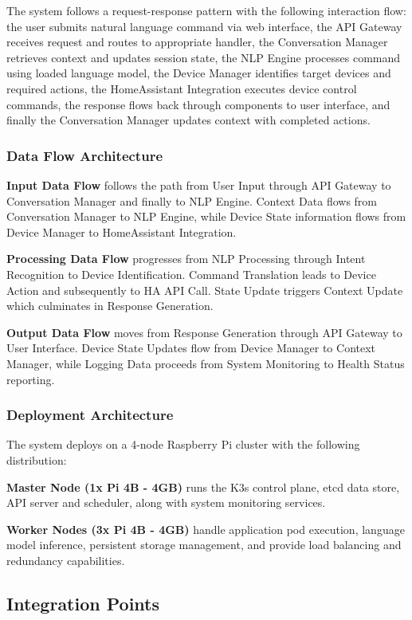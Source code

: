 \documentclass[12pt]{article}
\begin{document}
The system follows a request-response pattern with the following interaction flow: the user submits natural language command via web interface, the API Gateway receives request and routes to appropriate handler, the Conversation Manager retrieves context and updates session state, the NLP Engine processes command using loaded language model, the Device Manager identifies target devices and required actions, the HomeAssistant Integration executes device control commands, the response flows back through components to user interface, and finally the Conversation Manager updates context with completed actions.

\subsubsection{Data Flow Architecture}

\textbf{Input Data Flow} follows the path from User Input through API Gateway to Conversation Manager and finally to NLP Engine. Context Data flows from Conversation Manager to NLP Engine, while Device State information flows from Device Manager to HomeAssistant Integration.

\textbf{Processing Data Flow} progresses from NLP Processing through Intent Recognition to Device Identification. Command Translation leads to Device Action and subsequently to HA API Call. State Update triggers Context Update which culminates in Response Generation.

\textbf{Output Data Flow} moves from Response Generation through API Gateway to User Interface. Device State Updates flow from Device Manager to Context Manager, while Logging Data proceeds from System Monitoring to Health Status reporting.

\subsubsection{Deployment Architecture}

The system deploys on a 4-node Raspberry Pi cluster with the following distribution:

\textbf{Master Node (1x Pi 4B - 4GB)} runs the K3s control plane, etcd data store, API server and scheduler, along with system monitoring services.

\textbf{Worker Nodes (3x Pi 4B - 4GB)} handle application pod execution, language model inference, persistent storage management, and provide load balancing and redundancy capabilities.

\subsection{Integration Points}
\end{document}
